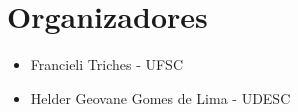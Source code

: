 
\chapter*{Organizadores}

\begin{itemize}
\item[] Francieli Triches - UFSC
\item[] Helder Geovane Gomes de Lima - UDESC
\end{itemize}